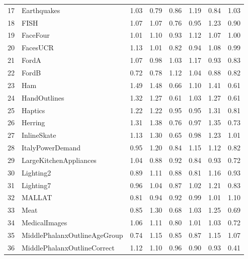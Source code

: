 \begin{longtable}{llllllll}
	17 &                     Earthquakes &  1.03 &  0.79 &       0.86 &  1.19 &  0.84 &  1.03 \\
	18 &                            FISH &  1.07 &  1.07 &       0.76 &  0.95 &  1.23 &  0.90 \\
	19 &                        FaceFour &  1.01 &  1.10 &       0.93 &  1.12 &  1.07 &  1.00 \\
	20 &                        FacesUCR &  1.13 &  1.01 &       0.82 &  0.94 &  1.08 &  0.99 \\
	21 &                           FordA &  1.07 &  0.98 &       1.03 &  1.17 &  0.93 &  0.83 \\
	22 &                           FordB &  0.72 &  0.78 &       1.12 &  1.04 &  0.88 &  0.82 \\
	23 &                             Ham &  1.49 &  1.48 &       0.66 &  1.10 &  1.41 &  0.61 \\
	24 &                    HandOutlines &  1.32 &  1.27 &       0.61 &  1.03 &  1.27 &  0.61 \\
	25 &                         Haptics &  1.22 &  1.22 &       0.95 &  0.95 &  1.31 &  0.81 \\
	26 &                         Herring &  1.31 &  1.38 &       0.76 &  0.97 &  1.35 &  0.73 \\
	27 &                     InlineSkate &  1.13 &  1.30 &       0.65 &  0.98 &  1.23 &  1.01 \\
	28 &                ItalyPowerDemand &  0.95 &  1.20 &       0.84 &  1.15 &  1.12 &  0.82 \\
	29 &          LargeKitchenAppliances &  1.04 &  0.88 &       0.92 &  0.84 &  0.93 &  0.72 \\
	30 &                       Lighting2 &  0.89 &  1.11 &       0.88 &  0.81 &  1.16 &  0.93 \\
	31 &                       Lighting7 &  0.96 &  1.04 &       0.87 &  1.02 &  1.21 &  0.83 \\
	32 &                          MALLAT &  0.81 &  0.94 &       0.92 &  0.99 &  1.01 &  1.10 \\
	33 &                            Meat &  0.85 &  1.30 &       0.68 &  1.03 &  1.25 &  0.69 \\
	34 &                   MedicalImages &  1.06 &  1.11 &       0.80 &  1.01 &  1.03 &  0.72 \\
	35 &    MiddlePhalanxOutlineAgeGroup &  0.74 &  1.15 &       0.85 &  0.87 &  1.15 &  1.07 \\
	36 &     MiddlePhalanxOutlineCorrect &  1.12 &  1.10 &       0.96 &  0.90 &  0.93 &  0.41 \\

\end{longtable}
